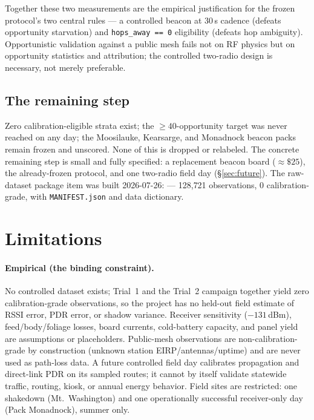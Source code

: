 \documentclass[11pt]{article}
\newcommand{\code}[1]{\texttt{\small #1}}
\begin{document}
Together these two measurements are the empirical justification for the
frozen protocol's two central rules --- a controlled beacon at 30\,s cadence
(defeats opportunity starvation) and \code{hops\_away == 0} eligibility
(defeats hop ambiguity). Opportunistic validation against a public mesh fails
not on RF physics but on opportunity statistics and attribution; the
controlled two-radio design is necessary, not merely preferable.

\subsection{The remaining step}

Zero calibration-eligible strata exist; the ${\geq}40$-opportunity target was
never reached on any day; the Moosilauke, Kearsarge, and Monadnock beacon
packs remain frozen and unscored. None of this is dropped or relabeled. The
concrete remaining step is small and fully specified: a replacement beacon
board (${\approx}\$25$), the already-frozen protocol, and one two-radio field day (\S\ref{sec:future}). The raw-dataset package item was built 2026-07-26:  --- 128{,}721 observations, 0 calibration-grade, with \code{MANIFEST.json} and data dictionary.

\section{Limitations}\label{sec:limits}

\paragraph{Empirical (the binding constraint).} No controlled dataset exists;
Trial~1 and the Trial~2 campaign together yield zero calibration-grade
observations, so the project has no held-out field estimate of RSSI error,
PDR error, or shadow variance. Receiver sensitivity ($-131$\,dBm),
feed/body/foliage losses, board currents, cold-battery capacity, and panel
yield are assumptions or placeholders. Public-mesh observations are
non-calibration-grade by construction (unknown station EIRP/antennas/uptime)
and are never used as path-loss data. A future controlled field day
calibrates propagation and direct-link PDR on its sampled routes; it cannot
by itself validate statewide traffic, routing, kiosk, or annual energy
behavior. Field sites are restricted: one shakedown (Mt.~Washington) and one
operationally successful receiver-only day (Pack Monadnock), summer only.
\end{document}
